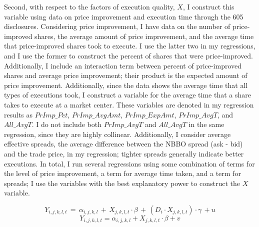 \documentclass[11pt,a4paper]{article}
\begin{document}
	Second, with respect to the factors of execution quality, $X$, I construct this variable using data on price improvement and execution time through the 605 disclosures. Considering price improvement, I have data on the number of price-improved shares, the average amount of price improvement, and the average time that price-improved shares took to execute. I use the latter two in my regressions, and I use the former to construct the percent of shares that were price-improved. Additionally, I include an interaction term between percent of price-improved shares and average price improvement; their product is the expected amount of price improvement. Additionally, since the data shows the average time that all types of executions took, I construct a variable for the average time that a share takes to execute at a market center. These variables are denoted in my regression results as $PrImp\_Pct$, $PrImp\_AvgAmt$, $PrImp\_ExpAmt$, $PrImp\_AvgT$, and $All\_AvgT$. I do not include both $PrImp\_AvgT$ and $All\_AvgT$ in the same regression, since they are highly collinear. Additionally, I consider average effective spreads, the average difference between the NBBO spread (ask - bid) and the trade price, in my regression; tighter spreads generally indicate better executions. In total, I run several regressions using some combination of terms for the level of price improvement, a term for average time taken, and a term for spreads; I use the variables with the best explanatory power to construct the $X$ variable. 
	
	\begin{equation}
	Y_{i, j, k, l, t} \,=\, \alpha_{i,j,k,l} \,+\,  X_{j, k, l, t} \cdot \beta \,+\,  (D_i \cdot X_{j, k, l, t}) \cdot \gamma\, +  u
	\end{equation}	
	\begin{equation}
	Y_{i, j, k, l, t} = \alpha_{i,j,k,l} +  X_{j, k, l, t} \cdot \beta +  v
	\end{equation}	
\end{document}
